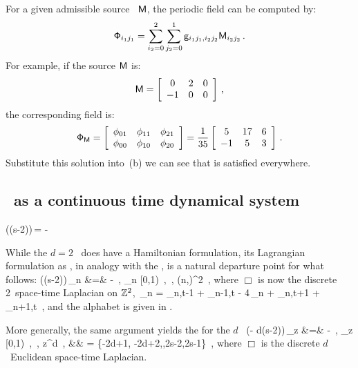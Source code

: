 For a given
admissible source \brick\ $\mathsf{M}$, the periodic field can be computed by:
\[
\mathsf{\Phi}_{i_1 j_1} =
\sum_{i_2=0}^2 \sum_{j_2=0}^1 \mathsf{g}_{i_1 j_1,i_2 j_2} \mathsf{M}_{i_2 j_2} \, .
\]
For example, if the source $\mathsf{M}$ is:
\[
\mathsf{M} =
 \left[
 \begin{array}{ccc}
 0 & 2 & 0 \\
 -1 & 0 & 0
 \end{array}
 \right] \, ,
\]
the corresponding field is:
\[
\mathsf{\Phi}_{\mathsf{M}} =
 \left[
 \begin{array}{ccc}
 \phi_{01} & \phi_{11} & \phi_{21} \\
 \phi_{00} & \phi_{10} & \phi_{20}
 \end{array}
 \right]
 =
 \frac{1}{35}
 \left[
 \begin{array}{ccc}
 5 & 17 & 6 \\
 -1 & 5 & 3
 \end{array}
 \right] \, .
\]
Substitute this solution into \,(b) we
can see that  is satisfied everywhere.

\subsection{{\Tzeta}}
\label{s:catLattZeta}

\subsection{\catLatt\ as a continuous time dynamical system}
\label{s:catLattODE}

\beq
 ((s-2))\,\Xx = -\Mm
{}

While the $d=2$ \catlatt\ does have a Hamiltonian
formulation, its Lagrangian  formulation as {\sPe}
, in analogy with the {\templatt} , is
a natural departure point for what follows:
\bea
 (({s}-2))\,\ssp_{n\zeit} &=& -
    \,, \qquad
  \ssp_{n\zeit} \in [0,1)
    \,, \quad
   \in \A
    \,, \quad
  (n,\zeit)\in \integers^{2}
\,,
\label{2dCoupledCats}
\eea
where $\Box$ is now the discrete 2\dmn\ space-time Laplacian
on $\mathbb{Z}^2$,
\beq
\Box\,\ssp_{n\zeit} =                   \ssp_{n,t-1} + \ssp_{n-1,t}
                   - 4\,\ssp_{n\zeit} + \ssp_{n,t+1} + \ssp_{n+1,t}
\,,
and the alphabet is given in .

     {
More generally, the same argument yields the {\sPe}  for
the $d$\dmn\ {\em \catlatt}
\bea
 (\Box - d({s}-2))\,\ssp_{z} &=& -
    \,, \qquad
  \ssp_{z} \in [0,1)
    \,, \quad
   \in \A
    \,, \quad
  z\in \integers^{d}
\,,
\continue
 && \A = \{-2d+1, -2d+2,\cdots,2{s}-2,2{s}-1\}
\,,
\label{LinearConn}
\eea
where $\Box$ is the discrete $d$\dmn\ Euclidean space-time Laplacian.
}

